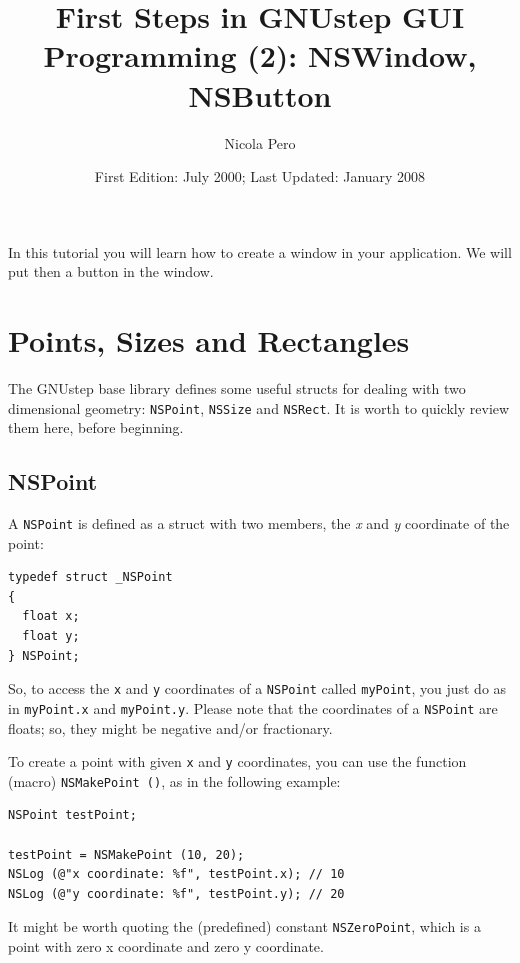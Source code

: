 \documentclass[a4paper]{article}
\begin{document}
\author{Nicola Pero}
\title{First Steps in GNUstep GUI Programming (2): NSWindow, NSButton}
\date{First Edition: July 2000; Last Updated: January 2008}
\maketitle

In this tutorial you will learn how to create a window in your
application.  We will put then a button in the window.

\section{Points, Sizes and Rectangles}
The GNUstep base library defines some useful structs for dealing with
two dimensional geometry: \texttt{NSPoint}, \texttt{NSSize} and
\texttt{NSRect}.  It is worth to quickly review them here, before
beginning.

\subsection{NSPoint}
A \texttt{NSPoint} is defined as a struct with two members, the
\emph{x} and \emph{y} coordinate of the point:
\begin{verbatim}
typedef struct _NSPoint
{
  float x;
  float y;
} NSPoint;
\end{verbatim}
So, to access the \texttt{x} and \texttt{y} coordinates of a
\texttt{NSPoint} called \texttt{myPoint}, you just do as in
\texttt{myPoint.x} and \texttt{myPoint.y}.  Please note that the
coordinates of a \texttt{NSPoint} are floats; so, they might be
negative and/or fractionary.

To create a point with given \texttt{x} and \texttt{y} coordinates,
you can use the function (macro) \texttt{NSMakePoint ()}, as in the
following example:
\begin{verbatim}
NSPoint testPoint;

testPoint = NSMakePoint (10, 20);
NSLog (@"x coordinate: %f", testPoint.x); // 10
NSLog (@"y coordinate: %f", testPoint.y); // 20
\end{verbatim}

It might be worth quoting the (predefined) constant
\texttt{NSZeroPoint}, which is a point with zero x coordinate and zero
y coordinate.
\end{document}
